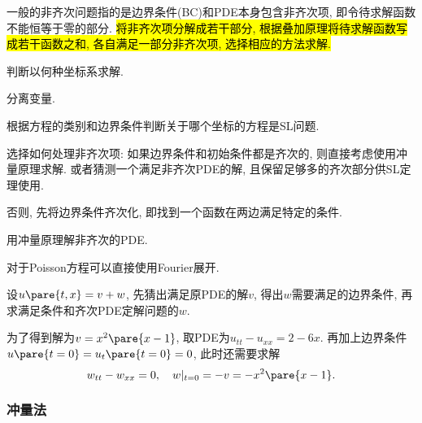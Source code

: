 \documentclass[hidelinks]{ctexart}
\begin{document}
一般的非齐次问题指的是边界条件(BC)和PDE本身包含非齐次项, 即令待求解函数不能恒等于零的部分. \hl{将非齐次项分解成若干部分, 根据叠加原理将待求解函数写成若干函数之和, 各自满足一部分非齐次项, 选择相应的方法求解.}
\begin{cenum}
    \item 判断以何种坐标系求解.
    \item 分离变量.
    \item 根据方程的类别和边界条件判断关于哪个坐标的方程是SL问题.
    \item 选择如何处理非齐次项: 如果边界条件和初始条件都是齐次的, 则直接考虑使用冲量原理求解. 或者猜测一个满足非齐次PDE的解, 且保留足够多的齐次部分供SL定理使用.
    \item 否则, 先将边界条件齐次化, 即找到一个函数在两边满足特定的条件.
    \item 用冲量原理解非齐次的PDE.
    \item 对于Poisson方程可以直接使用Fourier展开.
\end{cenum}
设$u\pare{t,x} = v+w$, 先猜出满足原PDE的解$v$, 得出$w$需要满足的边界条件, 再求满足条件和齐次PDE定解问题的$w$.
\begin{ex}
     为了得到解为$v=x^2\pare{x-1}$, 取PDE为$u_{tt} - u_{xx} = 2-6x$. 再加上边界条件$u\pare{t=0} = u_t\pare{t=0} = 0$, 此时还需要求解
     \[ w_{tt} - w_{xx} = 0,\quad w\vert_{t=0} = -v = -x^2\pare{x-1}. \]
\end{ex}

\subsubsection{冲量法} %
\label{ssub:冲量法}
\end{document}
